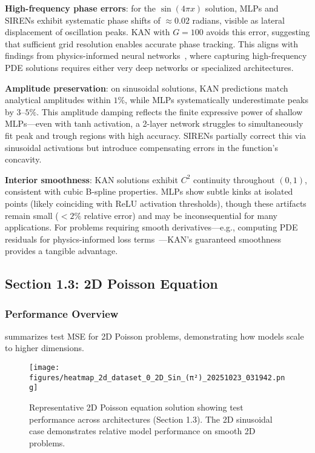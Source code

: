 \documentclass[11pt,a4paper]{article}
\begin{document}
\textbf{High-frequency phase errors}: for the $\sin(4\pi x)$ solution, MLPs and SIRENs exhibit systematic phase shifts of $\approx 0.02$ radians, visible as lateral displacement of oscillation peaks. KAN with $G=100$ avoids this error, suggesting that sufficient grid resolution enables accurate phase tracking. This aligns with findings from physics-informed neural networks~\citep{raissi2019physics}, where capturing high-frequency PDE solutions requires either very deep networks or specialized architectures.

\textbf{Amplitude preservation}: on sinusoidal solutions, KAN predictions match analytical amplitudes within $1\%$, while MLPs systematically underestimate peaks by $3$--$5\%$. This amplitude damping reflects the finite expressive power of shallow MLPs—even with tanh activation, a 2-layer network struggles to simultaneously fit peak and trough regions with high accuracy. SIRENs partially correct this via sinusoidal activations but introduce compensating errors in the function's concavity.

\textbf{Interior smoothness}: KAN solutions exhibit $C^2$ continuity throughout $(0,1)$, consistent with cubic B-spline properties. MLPs show subtle kinks at isolated points (likely coinciding with ReLU activation thresholds), though these artifacts remain small ($<2\%$ relative error) and may be inconsequential for many applications. For problems requiring smooth derivatives—e.g., computing PDE residuals for physics-informed loss terms~\citep{raissi2019physics}—KAN's guaranteed smoothness provides a tangible advantage.

\subsection{Section 1.3: 2D Poisson Equation}

\subsubsection{Performance Overview}

 summarizes test MSE for 2D Poisson problems, demonstrating how models scale to higher dimensions.

\begin{figure}[htbp]
\centering
\texttt{[image: figures/heatmap\_2d\_dataset\_0\_2D\_Sin\_(π²)\_20251023\_031942.png]}
\caption{Representative 2D Poisson equation solution showing test performance across architectures (Section 1.3). The 2D sinusoidal case demonstrates relative model performance on smooth 2D problems.}
\label{fig:s13_heatmap}
\end{figure}
\end{document}
